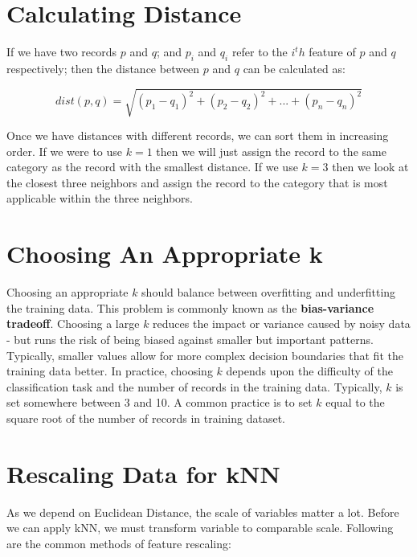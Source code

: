 \documentclass[10pt, letterpaper, twoside]{memoir}\usepackage{knitr}
\begin{document}
\section{Calculating Distance}

If we have two records $p$ and $q$; and $p_i$ and $q_i$ refer to the $i^th$ feature of $p$ and $q$ respectively; then the distance between $p$ and $q$ can be calculated as:

\[ dist(p, q) = \sqrt{(p_1 - q_1)^2 + (p_2 - q_2)^2 + ... + (p_n - q_n)^2} \]

Once we have distances with different records, we can sort them in increasing order. If we were to use $k = 1$ then we will just assign the record to the same category as the record with the smallest distance. If we use $k = 3$ then we look at the closest three neighbors and assign the record to the category that is most applicable within the three neighbors. 

\section{Choosing An Appropriate k}

Choosing an appropriate $k$ should balance between overfitting and underfitting the training data. This problem is commonly known as the \textbf{bias-variance tradeoff}. Choosing a large $k$ reduces the impact or variance caused by noisy data - but runs the risk of being biased against smaller but important patterns. Typically, smaller values allow for more complex decision boundaries that fit the training data better. In practice, choosing $k$ depends upon the difficulty of the classification task and the number of records in the training data. Typically, $k$ is set somewhere between 3 and 10. A common practice is to set $k$ equal to the square root of the number of records in training dataset.

\section{Rescaling Data for kNN}

As we depend on Euclidean Distance, the scale of variables matter a lot. Before we can apply kNN, we must transform variable to comparable scale. Following are the common methods of feature rescaling:
\end{document}
